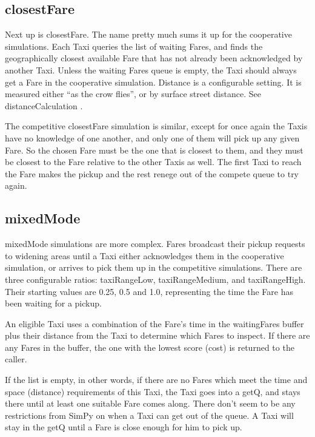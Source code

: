 \documentclass[11pt,letterpaper,onecolumn,twoside,openright,final]{report}
\begin{document}
\subsection{closestFare}
Next up is closestFare.
The name pretty much sums it up for the cooperative simulations.
Each Taxi queries the list of waiting Fares, and finds the geographically closest available Fare that has not already been acknowledged by another Taxi.
Unless the waiting Fares queue is empty, the Taxi should always get a Fare in the cooperative simulation.
Distance is a configurable setting.
It is measured either ``as the crow flies'', or by surface street distance.
See distanceCalculation .

The competitive closestFare simulation is similar, except for once again the Taxis have no knowledge of one another, and only one of them will pick up any given Fare.
So the chosen Fare must be the one that is closest to them, and they must be closest to the Fare relative to the other Taxis as well.
The first Taxi to reach the Fare makes the pickup and the rest renege out of the compete queue to try again.

\subsection{mixedMode}
mixedMode simulations are more complex.
Fares broadcast their pickup requests to widening areas until a Taxi either acknowledges them in the cooperative simulation, or arrives to pick them up in the competitive simulations.
There are three configurable ratios: taxiRangeLow, taxiRangeMedium, and taxiRangeHigh.
Their starting values are 0.25, 0.5 and 1.0, representing the time the Fare has been waiting for a pickup.

An eligible Taxi uses a combination of the Fare's time in the waitingFares buffer plus their distance from the Taxi to determine which Fares to inspect.
If there are any Fares in the buffer, the one with the lowest score (cost) is returned to the caller.

If the list is empty, in other words, if there are no Fares which meet the time and space (distance) requirements of this Taxi, the Taxi goes into a getQ, and stays there until at least one suitable Fare comes along.
There don't seem to be any restrictions from SimPy on when a Taxi can get out of the queue.
A Taxi will stay in the getQ until a Fare is close enough for him to pick up.
\end{document}
